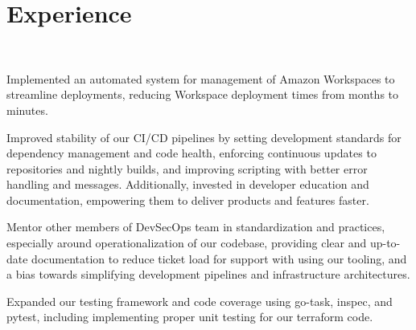 \documentclass[letterpaper]{deedy-resume-openfont} %
\begin{document}
\begin{minipage}[t]{0.70\textwidth} %


\section{Experience}

\\

\vspace{\topsep} %
\begin{tightitemize}
\item Implemented an automated system for management of Amazon Workspaces to streamline deployments, reducing Workspace deployment times from months to minutes.
\item Improved stability of our CI/CD pipelines by setting development standards for dependency management and code health, enforcing continuous updates to repositories and nightly builds, and improving scripting with better error handling and messages. Additionally, invested in developer education and documentation, empowering them to deliver products and features faster.
\item Mentor other members of DevSecOps team in standardization and practices, especially around operationalization of our codebase, providing clear and up-to-date documentation to reduce ticket load for support with using our tooling, and a bias towards simplifying development pipelines and infrastructure architectures.
\item Expanded our testing framework and code coverage using go-task, inspec, and pytest, including implementing proper unit testing for our terraform code.
\end{tightitemize}

\sectionspace

 \\


\end{minipage}
\end{document}
